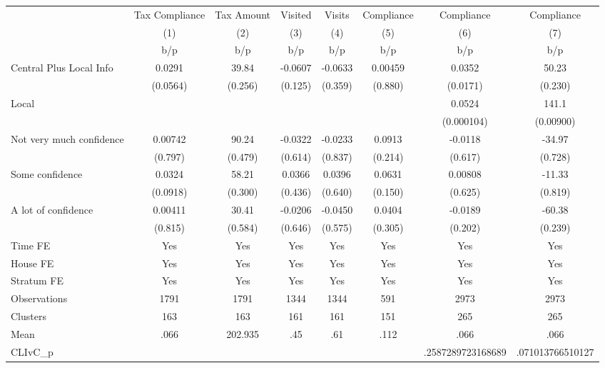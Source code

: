 {
\def\sym#1{\ifmmode^{#1}\else\(^{#1}\)\fi}
\begin{tabular}{l*{7}{c}}
\toprule
                &\multicolumn{1}{c}{Tax Compliance}&\multicolumn{1}{c}{Tax Amount}&\multicolumn{1}{c}{Visited}&\multicolumn{1}{c}{Visits}&\multicolumn{1}{c}{Compliance}&\multicolumn{1}{c}{Compliance}&\multicolumn{1}{c}{Compliance}\\
                &\multicolumn{1}{c}{(1)}&\multicolumn{1}{c}{(2)}&\multicolumn{1}{c}{(3)}&\multicolumn{1}{c}{(4)}&\multicolumn{1}{c}{(5)}&\multicolumn{1}{c}{(6)}&\multicolumn{1}{c}{(7)}\\
                &      b/p&      b/p&      b/p&      b/p&      b/p&      b/p&      b/p\\
\midrule
Central Plus Local Info&   0.0291&    39.84&  -0.0607&  -0.0633&  0.00459&   0.0352&    50.23\\
                & (0.0564)&  (0.256)&  (0.125)&  (0.359)&  (0.880)& (0.0171)&  (0.230)\\
Local           &         &         &         &         &         &   0.0524&    141.1\\
                &         &         &         &         &         &(0.000104)&(0.00900)\\
Not very much confidence&  0.00742&    90.24&  -0.0322&  -0.0233&   0.0913&  -0.0118&   -34.97\\
                &  (0.797)&  (0.479)&  (0.614)&  (0.837)&  (0.214)&  (0.617)&  (0.728)\\
Some confidence &   0.0324&    58.21&   0.0366&   0.0396&   0.0631&  0.00808&   -11.33\\
                & (0.0918)&  (0.300)&  (0.436)&  (0.640)&  (0.150)&  (0.625)&  (0.819)\\
A lot of confidence&  0.00411&    30.41&  -0.0206&  -0.0450&   0.0404&  -0.0189&   -60.38\\
                &  (0.815)&  (0.584)&  (0.646)&  (0.575)&  (0.305)&  (0.202)&  (0.239)\\
Time FE         &      Yes&      Yes&      Yes&      Yes&      Yes&      Yes&      Yes\\
House FE        &      Yes&      Yes&      Yes&      Yes&      Yes&      Yes&      Yes\\
Stratum FE      &      Yes&      Yes&      Yes&      Yes&      Yes&      Yes&      Yes\\
\midrule
Observations    &     1791&     1791&     1344&     1344&      591&     2973&     2973\\
Clusters        &      163&      163&      161&      161&      151&      265&      265\\
Mean            &     .066&  202.935&      .45&      .61&     .112&     .066&     .066\\
CLIvC\_p         &         &         &         &         &         &.2587289723168689&.071013766510127\\
\bottomrule
\end{tabular}
}
